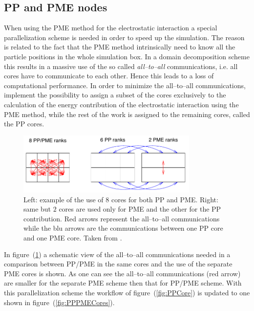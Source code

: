 \subsection{PP and PME nodes}
When using the \ac{PME} method for the electrostatic interaction a special parallelization scheme is needed in order to speed up the simulation. The reason is related to the fact that the \ac{PME} method intrinsically need to know all the particle positions in the whole simulation box. In a domain decomposition scheme this results in a massive use of the so called \textit{all--to--all} communications, i.e. all cores have to communicate to each other. Hence this leads to a loss of computational performance. In order to minimize the all--to--all communications, \gromacs implement the possibility to assign a subset of the cores exclusively to the calculation of the energy contribution of the electrostatic interaction using the \ac{PME} method, while the rest of the work is assigned to the remaining cores, called the \ac{PP} cores. 
\begin{figure}[h!t]
	\centering
	\includegraphics[width=0.8\textwidth]{./img/PMENodes}
	\caption{Left: example of the use of $8$ cores for both \acs{PP} and \acs{PME}. Right: same but $2$ cores are used only for \acs{PME} and the other for the \acs{PP} contribution. Red arrows represent the all--to--all communications while the blu arrows are the communications between one \acs{PP} core and one \acs{PME} core. Taken from \cite{gromacsManual}.}
	\label{fig:PMENodes}
\end{figure} 
In figure~(\ref{fig:PMENodes}) a schematic view of the all--to--all communications needed in a comparison between \ac{PP}/\ac{PME} in the same cores and the use of the separate \ac{PME} cores is shown. As one can see the all--to--all communications (red arrow) are smaller for the separate \acs{PME} scheme then that for \ac{PP}/\ac{PME} scheme. With this parallelization scheme the workflow of figure~(\ref{fig:PPCore}) is updated to one shown in figure~(\ref{fig:PPPMECores}). 
